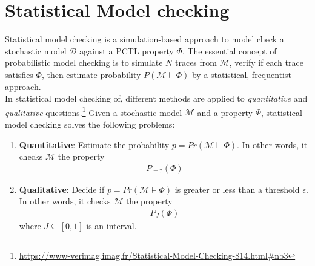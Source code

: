 \section{Statistical Model checking}
Statistical model checking is a simulation-based approach to model check a stochastic model
$\mathcal{D}$ against a PCTL property $\Phi$. The essential concept of probabilistic model
checking is to simulate $N$ traces from $\mathcal{M}$, verify if each trace satisfies $\Phi$, then
estimate probability $P(\mathcal{M}\models\Phi)$ by a statistical, frequentist approach.\\
In statistical model checking of, different methods are applied to \textit{quantitative} and
\textit{qualitative}
questions.\footnote{\url{https://www-verimag.imag.fr/Statistical-Model-Checking-814.html\#nb3}}
Given a stochastic model $\mathcal{M}$ and a property $\Phi$, statistical model checking solves the
following problems:
\begin{enumerate}
    \item \textbf{Quantitative}: Estimate the probability $p = Pr(\mathcal{M}\models\Phi)$. In other
          words, it checks $\mathcal{M}$ the property \begin{align*}
              P_{=?}(\Phi)
          \end{align*}
    \item \textbf{Qualitative}: Decide if $p = Pr(\mathcal{M}\models\Phi)$ is greater or less than a
          threshold $\epsilon$. In other words, it checks $\mathcal{M}$ the property \begin{align*}
              P_J(\Phi)
          \end{align*}
          where $J\subseteq[0,1]$ is an interval.
\end{enumerate}

